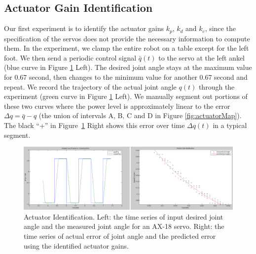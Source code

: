 \subsection{Actuator Gain Identification}
Our first experiment is to identify the actuator gains $k_p$, $k_d$ and $k_c$, since the specification of the servos does not provide the necessary information to compute them. In the experiment, we clamp the entire robot on a table except for the left foot. We then send a periodic control signal $\bar{q}(t)$ to the servo at the left ankel (blue curve in Figure \ref{fig:actuatorId} Left). The desired joint angle stays at the maximum value for 0.67 second, then changes to the minimum value for another 0.67 second and repeat. We record the trajectory of the actual joint angle $q(t)$ through the experiment (green curve in Figure \ref{fig:actuatorId} Left). We manually segment out portions of these two curves where the power level is approximately linear to the error $\Delta q = \bar{q} - q$ (the union of intervals A, B, C and D in Figure \ref{fig:actuatorMap}). The black ``+'' in Figure~\ref{fig:actuatorId} Right shows this error over time $\Delta q(t)$ in a typical segment.

\begin{figure}[!t]
  \centering
  \includegraphics[width=\textwidth]{figures/actuatorId}
  \caption{Actuator Identification. Left: the time series of input desired joint angle and the measured joint angle for an AX-18 servo. Right: the time series of actual error of joint angle and the predicted error using the identified actuator gains.  }
  \label{fig:actuatorId}
\end{figure}

